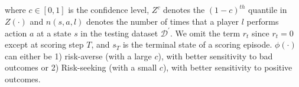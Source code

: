 \documentclass{article}
\newcommand{\state}{s}
\newcommand{\action}{a}
\newcommand{\reward}{r}
\newcommand{\dataset}{\mathcal{D}}
\newcommand{\confidence}{c}
\newcommand{\impact}{\phi}
\newcommand{\playerId}{l}
\begin{document}
where $\confidence\in[0,1]$ is the confidence level, $Z^{\confidence}$ denotes the $(1-\confidence)^{th}$ quantile in $Z(\cdot)$ and $n(\state,\action,\playerId)$ denotes the number of times that a player $\playerId$ performs action $\action$ at a state $\state$ in the testing dataset $\dataset^{\prime}$. We omit the term $\reward_t$ since $\reward_{t}=0$ except at scoring step $T$, and $\state_{T}$ is the terminal state of a scoring episode.
$\impact(\cdot)$ can either be 1) risk-averse (with a large $\confidence$), with better sensitivity to bad outcomes or 2) Risk-seeking (with a small $\confidence$), with better sensitivity to positive outcomes.
\vspace{-0.15in}
\end{document}
